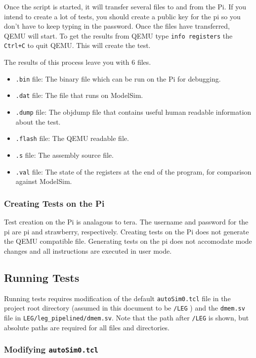 Once the script is started, it will transfer several files to and from the Pi. If you intend to create a lot of tests, you should create a public key for the pi so you don't have to keep typing in the password. Once the files have transferred, QEMU will start. To get the results from QEMU type \texttt{info registers} the \texttt{Ctrl+C} to quit QEMU. This will create the test. 

The results of this process leave you with 6 files. 
\begin{itemize}
\item \texttt{.bin} file: The binary file which can be run on the Pi for debugging. 
\item \texttt{.dat} file: The file that runs on ModelSim. 
\item \texttt{.dump} file: The objdump file that contains useful human readable information about the test.
\item \texttt{.flash} file: The QEMU readable file. 
\item \texttt{.s} file: The assembly source file.
\item \texttt{.val} file: The state of the registers at the end of the program, for comparison against ModelSim. 
\end{itemize}

\subsubsection{Creating Tests on the Pi}
Test creation on the Pi is analagous to tera. 
The username and password for the pi are pi and strawberry, respectively. Creating tests on the Pi does not generate the QEMU compatible file. Generating tests on the pi does not accomodate mode changes and all instructions are executed in user mode. 
\subsection{Running Tests}

Running tests requires modification of the default \texttt{autoSim0.tcl} 
file in the project root directory (assumed in this document to be \texttt{/LEG} )
and the \texttt{dmem.sv} file in \texttt{LEG/leg\_pipelined/dmem.sv}. 
Note that the path after \texttt{/LEG} is shown, but absolute paths are 
required for all files and directories.

\subsubsection{Modifying \texttt{autoSim0.tcl}}

